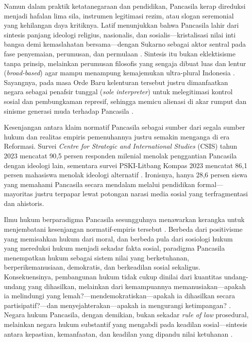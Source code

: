 \documentclass[journal]{IEEEtran}
\begin{document}
Namun dalam praktik ketatanegaraan dan pendidikan, Pancasila kerap direduksi menjadi hafalan lima sila, instrumen legitimasi rezim, atau slogan seremonial yang kehilangan daya kritiknya. Latif menunjukkan bahwa Pancasila lahir dari sintesis panjang ideologi religius, nasionalis, dan sosialis---kristalisasi nilai inti bangsa demi kemaslahatan bersama---dengan Sukarno sebagai aktor sentral pada fase penyemaian, perumusan, dan permulaan \cite{latif2018}. Sintesis itu bukan eklektisisme tanpa prinsip, melainkan perumusan filosofis yang sengaja dibuat luas dan lentur (\textit{broad-based}) agar mampu menampung kemajemukan ultra-plural Indonesia \cite{madungmere2021,lenggono2021}. Sayangnya, pada masa Orde Baru kelenturan tersebut justru dimanfaatkan negara sebagai penafsir tunggal (\textit{sole interpreter}) untuk melegitimasi kontrol sosial dan pembungkaman represif, sehingga memicu alienasi di akar rumput dan sinisme generasi muda terhadap Pancasila \cite{kim2024,suntana2023}.

Kesenjangan antara klaim normatif Pancasila sebagai sumber dari segala sumber hukum dan realitas empiris pemenuhannya justru semakin menganga di era Reformasi. Survei \textit{Centre for Strategic and International Studies} (CSIS) tahun 2023 mencatat 90,5 persen responden milenial menolak penggantian Pancasila dengan ideologi lain, sementara survei PSKI-Litbang Kompas 2023 mencatat 86,1 persen mahasiswa menolak ideologi alternatif \cite{csis2023,kompas2023}. Ironisnya, hanya 28,6 persen siswa yang memahami Pancasila secara mendalam melalui pendidikan formal---mayoritas justru terpapar lewat potongan narasi media sosial yang terfragmentasi dan ahistoris.

Ilmu hukum berparadigma Pancasila sesungguhnya menawarkan kerangka untuk menjembatani kesenjangan normatif-empiris tersebut \cite{rahmatullah2022,aswandi2019,syamsudin2022}. Berbeda dari positivisme yang memisahkan hukum dari moral, dan berbeda pula dari sosiologi hukum yang mereduksi hukum menjadi sekadar fakta sosial, paradigma Pancasila menempatkan hukum sebagai sistem nilai yang berketuhanan, berperikemanusiaan, demokratis, dan berkeadilan sosial sekaligus. Konsekuensinya, pembangunan hukum tidak cukup dinilai dari kuantitas undang-undang yang dihasilkan, melainkan dari kemampuannya memanusiakan---apakah ia melindungi yang lemah?---mendemokratiskan---apakah ia dihasilkan secara partisipatif?---dan menyejahterakan---apakah ia mengurangi ketimpangan? \cite{aswandi2019,rahmatullah2022,mahfud2009}. Negara hukum Pancasila, dengan demikian, bukan sekadar \textit{rule of law} prosedural, melainkan negara hukum substantif yang mengabdi pada keadilan sosial---sintesis antara kepastian, kemanfaatan, dan keadilan yang dipandu nilai ketuhanan \cite{aswandi2019,syamsudin2022}.
\end{document}

